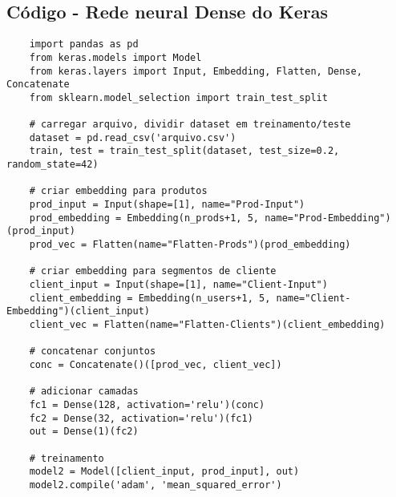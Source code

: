 \documentclass[
	12pt,	%
	openright,			%
	oneside,            %
	a4paper,			%
	english,			%
	french,				%
	spanish,			%
	brazil				%
]{abntex2}
\begin{document}
\begin{anexosenv}
\partanexos

\chapter{Código - Rede neural Dense do Keras} \label{anexo1}
\begin{lstlisting}
    import pandas as pd
    from keras.models import Model
    from keras.layers import Input, Embedding, Flatten, Dense, Concatenate
    from sklearn.model_selection import train_test_split
 
    # carregar arquivo, dividir dataset em treinamento/teste
    dataset = pd.read_csv('arquivo.csv')
    train, test = train_test_split(dataset, test_size=0.2, random_state=42)

    # criar embedding para produtos
    prod_input = Input(shape=[1], name="Prod-Input")
    prod_embedding = Embedding(n_prods+1, 5, name="Prod-Embedding")(prod_input)
    prod_vec = Flatten(name="Flatten-Prods")(prod_embedding)
    
    # criar embedding para segmentos de cliente
    client_input = Input(shape=[1], name="Client-Input")
    client_embedding = Embedding(n_users+1, 5, name="Client-Embedding")(client_input)
    client_vec = Flatten(name="Flatten-Clients")(client_embedding)
    
    # concatenar conjuntos
    conc = Concatenate()([prod_vec, client_vec])
    
    # adicionar camadas
    fc1 = Dense(128, activation='relu')(conc)
    fc2 = Dense(32, activation='relu')(fc1)
    out = Dense(1)(fc2)
    
    # treinamento
    model2 = Model([client_input, prod_input], out)
    model2.compile('adam', 'mean_squared_error')
\end{lstlisting}

\end{anexosenv}

\printindex
\end{document}
